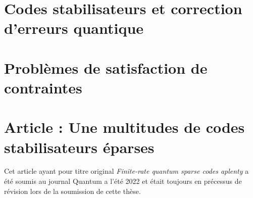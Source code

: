 \section{Codes stabilisateurs et correction d'erreurs quantique}

\section{Problèmes de satisfaction de contraintes}

\section{Article : Une multitudes de codes stabilisateurs éparses}

Cet article ayant pour titre original \textit{Finite-rate quantum sparse codes aplenty}
a été soumis au journal Quantum a l'été 2022 et était toujours en
précessus de révision lors de la soumission de cette thèse.


